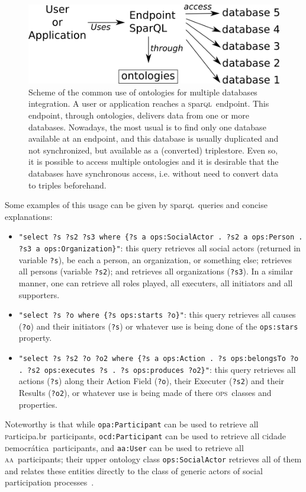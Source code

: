 \documentclass[10pt,letterpaper]{article}
\newcommand{\ops}{\textsc{ops}}
\newcommand{\sparql}{\textsc{s}par\textsc{ql}}
\newcommand{\aan}{\textsc{aa}}
\newcommand{\cidadedemocratica}{\textsc{c}idade \textsc{d}emocr\'atica}
\newcommand{\participa}{\textsc{p}articipa.br}
\begin{document}
\begin{figure}
    \centering
        \includegraphics[width=0.9\columnwidth]{figs/endpoint}
    \caption{Scheme of the common use of ontologies for multiple databases integration. A user or application reaches a \sparql\ endpoint. This endpoint, through ontologies, delivers data from one or more databases. Nowadays, the most usual is to find only one database available at an endpoint, and this database is usually duplicated and not synchronized, but available as a (converted) triplestore. Even so, it is possible to access multiple ontologies and it is desirable that the databases have synchronous access, i.e. without need to convert data to triples beforehand.}
    \label{endpoint}
\end{figure}

Some examples of this usage can be given by \sparql\ queries and concise explanations:
\begin{itemize}
    \item \texttt{"select ?s ?s2 ?s3 where \{?s a ops:SocialActor . ?s2 a ops:Person . ?s3 a ops:Organization\}"}: this query retrieves all social actors (returned in variable \texttt{?s}), be each a person, an organization, or something else; retrieves all persons (variable \texttt{?s2}); and retrieves all organizations (\texttt{?s3}). In a similar manner, one can retrieve all roles played, all executers, all initiators and all supporters.
    \item \texttt{"select ?s ?o where \{?s ops:starts ?o\}"}: this query retrieves all causes ({\tt ?o}) and their initiators ({\tt ?s}) or whatever use is being done of the {\tt ops:stars} property.
    \item \texttt{"select ?s ?s2 ?o ?o2 where \{?s a ops:Action . ?s ops:belongsTo ?o . ?s2 ops:executes ?s . ?s ops:produces ?o2\}"}: this query retrieves all actions (\texttt{?s}) along their Action Field (\texttt{?o}), their Executer (\texttt{?s2}) and their Results (\texttt{?o2}), or whatever use is being made of there \ops\ classes and properties.
\end{itemize}

Noteworthy is that while {\tt opa:Participant} can be used to retrieve all \participa\ participants, {\tt ocd:Participant} can be used to retrieve all \cidadedemocratica\ participants, and {\tt aa:User} can be used to retrieve all \aan\ participants; their upper ontology class {\tt ops:SocialActor} retrieves all of them and relates these entities directly to the class of generic actors of social participation processes~\cite{pnud5}.
\end{document}
